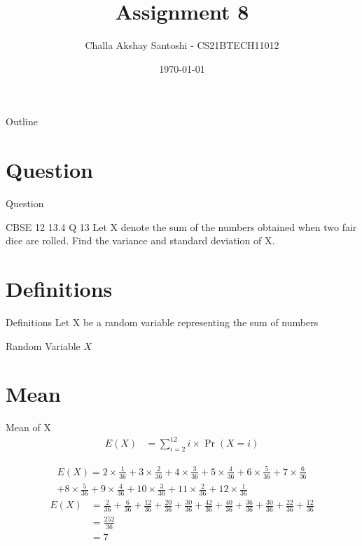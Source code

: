 \documentclass{beamer}
\title{Assignment 8}
\author{Challa Akshay Santoshi - CS21BTECH11012}
\date{\today}
\providecommand{\pr}[1]{\ensuremath{\Pr\left(#1\right)}}
\providecommand{\pr}[1]{\ensuremath{\Pr\left(#1\right)}}
\begin{document}
\begin{frame}
    \titlepage 
\end{frame}

\logo{}


\begin{frame}{Outline}
    \tableofcontents
\end{frame}


\section{Question}
\begin{frame}{Question}
\begin{block}{CBSE 12 13.4 Q 13} Let X denote the sum of the numbers obtained when two fair dice are rolled. Find the variance and standard deviation of X.
    \end{block}
\end{frame}

\section{Definitions}
\begin{frame}{Definitions}
Let X be a random variable representing the sum of numbers
   \begin{table}[ht!]
    \centering
    
    \caption{Random Variable $X$}
	\label{table:table1}
\end{table} 
\end{frame}

\section{Mean}
\begin{frame}{Mean of X}
\begin{align}
    E(X) &= \sum_{i=2}^{12} i\times \pr{X=i}
\end{align}

\begin{multline}
    E(X) = 2 \times \frac{1}{36} + 3 \times \frac{2}{36} + 4 \times \frac{3}{36} + 5 \times \frac{4}{36} + 6 \times \frac{5}{36} + 7 \times \frac{6}{36}\\ + 8 \times \frac{5}{36} + 9 \times \frac{4}{36} + 10 \times \frac{3}{36} + 11 \times \frac{2}{36} + 12\times \frac{1}{36}
\end{multline}
\begin{align}
    E(X) &= \frac{2}{36} + \frac{6}{36} + \frac{12}{36} + \frac{20}{36} + \frac{30}{36} + \frac{42}{36} + \frac{40}{36} + \frac{36}{36} + \frac{30}{36} + \frac{22}{36} + \frac{12}{36}\\
    &= \frac{252}{36}\\
    &= 7
\end{align}
    

   
\end{frame}
\end{document}
